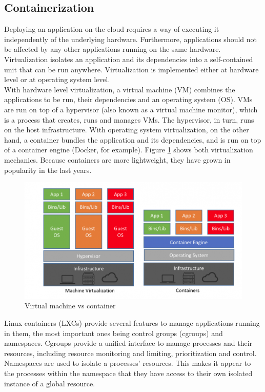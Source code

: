 \subsection{Containerization}
Deploying an application on the cloud requires a way of executing it independently of the underlying hardware. Furthermore, applications should not be affected by any other applications running on the same hardware. Virtualization isolates an application and its dependencies into a self-contained unit that can be run anywhere\citep{Virtualization}.
Virtualization is implemented either at hardware level or at operating system level. \\

With hardware level virtualization, a virtual machine (VM) combines the applications to be run, their dependencies and an operating system (OS). VMs are run on top of a hypervisor (also known as a virtual machine monitor), which is a process that creates, runs and manages VMs. The hypervisor, in turn, runs on the host infrastructure. With operating system virtualization, on the other hand, a container bundles the application and its dependencies, and is run on top of a container engine (Docker, for example). Figure \ref{fig:container_vs_vm} shows both virtualization mechanics. Because containers are more lightweight, they have grown in popularity in the last years\citep{Container}. \\

\begin{figure}[h]
\begin{center}
\includegraphics[width=0.9 \textwidth]{Images/VM_vs_container.png}
\end{center}
\caption{Virtual machine vs container \citep{Container-vs-vm}}
\label{fig:container_vs_vm}
\end{figure}

\newpage

Linux containers (LXCs) provide several features to manage applications running in them, the most important ones being control groups (cgroups) and namespaces. Cgroups provide a unified interface to manage processes and their resources, including resource monitoring and limiting, prioritization and control\citep{Cgroup}. Namespaces are used to isolate a processes' resources. This makes it appear to the processes within the namespace that they have access to their own isolated instance of a global resource\citep{Namespace}.

